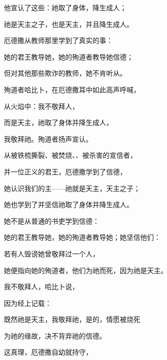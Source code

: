 他宣认了这些：祂取了身体，降生成人；\par

祂是天主之子，也是天主，并且降生成人。\par

厄德撒从教师那里学到了真实的事：\par

她的君王教导她，她的殉道者教导她信德；\par

但对其他那些欺诈的教师，她不肯听从。\par

殉道者哈比卜，在厄德撒耳中如此高声呼喊，\par

从火焰中：我不敬拜人，\par

而是天主，祂取了身体并降生成人，\par

我敬拜祂。殉道者扬声宣认。\par

从被铁梳撕裂、被焚烧、、被杀害的宣信者，\par

并一位正义的君王，厄德撒学到了信德，\par

她认识我们的主——祂就是天主，天主之子；\par

她也学到了并坚信祂取了身体并降生成人。\par

她不是从普通的书吏学到信德：\par

她的君王教导她，她的殉道者教导她；她坚信他们：\par

若有人毁谤她曾敬拜过一个人，\par

她便指向她的殉道者，他们为祂而死，因为祂是天主。\par

我不敬拜人，哈比卜说，\par

因为经上记载：\par

既然祂是天主，我敬拜祂，是的，情愿被烧死\par

为祂的缘故，决不背弃祂的信德。\par

这真理，厄德撒自幼就持守，\par

